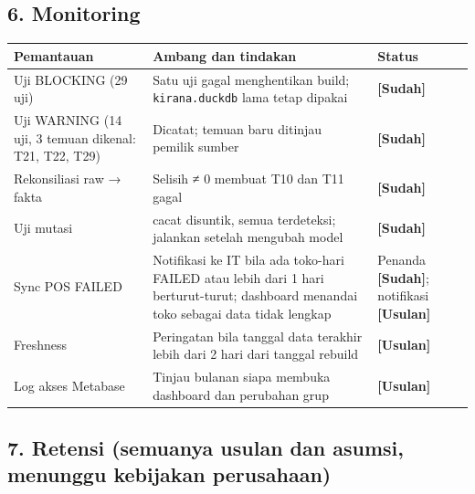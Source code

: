 \documentclass[10pt,a4paper]{article}
\begin{document}
\subsection{6. Monitoring}\label{monitoring}

{\def\LTcaptype{none} %
\begin{longtable}[]{@{}
  >{\raggedright\arraybackslash}p{}
  >{\raggedright\arraybackslash}p{}
  >{\raggedright\arraybackslash}p{}@{}}
\toprule\noalign{}
\begin{minipage}[b]{\linewidth}\raggedright
Pemantauan
\end{minipage} & \begin{minipage}[b]{\linewidth}\raggedright
Ambang dan tindakan
\end{minipage} & \begin{minipage}[b]{\linewidth}\raggedright
Status
\end{minipage} \\
\midrule\noalign{}
\endhead
\bottomrule\noalign{}
\endlastfoot
Uji BLOCKING (29 uji) & Satu uji gagal menghentikan build; \texttt{kirana.duckdb} lama tetap dipakai & \textbf{{[}Sudah{]}} \\
Uji WARNING (14 uji, 3 temuan dikenal: T21, T22, T29) & Dicatat; temuan baru ditinjau pemilik sumber & \textbf{{[}Sudah{]}} \\
Rekonsiliasi raw → fakta & Selisih ≠ 0 membuat T10 dan T11 gagal & \textbf{{[}Sudah{]}} \\
Uji mutasi & 39 cacat disuntik, semua terdeteksi; jalankan setelah mengubah model & \textbf{{[}Sudah{]}} \\
Sync POS FAILED & Notifikasi ke IT bila ada toko-hari FAILED atau lebih dari 1 hari berturut-turut; dashboard menandai toko sebagai data tidak lengkap & Penanda \textbf{{[}Sudah{]}}; notifikasi \textbf{{[}Usulan{]}} \\
Freshness & Peringatan bila tanggal data terakhir lebih dari 2 hari dari tanggal rebuild & \textbf{{[}Usulan{]}} \\
Log akses Metabase & Tinjau bulanan siapa membuka dashboard dan perubahan grup & \textbf{{[}Usulan{]}} \\
\end{longtable}
}

\subsection{7. Retensi (semuanya usulan dan asumsi, menunggu kebijakan perusahaan)}\label{retensi-semuanya-usulan-dan-asumsi-menunggu-kebijakan-perusahaan}
\end{document}
